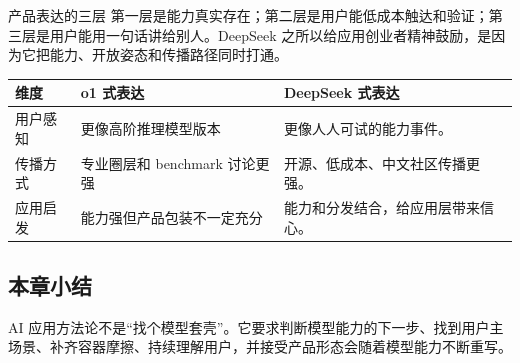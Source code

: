\begin{importantbox}{产品表达的三层}
第一层是能力真实存在；第二层是用户能低成本触达和验证；第三层是用户能用一句话讲给别人。DeepSeek 之所以给应用创业者精神鼓励，是因为它把能力、开放姿态和传播路径同时打通。
\end{importantbox}

\noindent\begin{tabularx}{\textwidth}{p{}p{}X}
\toprule
维度 & o1 式表达 & DeepSeek 式表达 \\
\midrule
用户感知 & 更像高阶推理模型版本 & 更像人人可试的能力事件。 \\
传播方式 & 专业圈层和 benchmark 讨论更强 & 开源、低成本、中文社区传播更强。 \\
应用启发 & 能力强但产品包装不一定充分 & 能力和分发结合，给应用层带来信心。 \\
\bottomrule
\end{tabularx}

\subsection{本章小结}

AI 应用方法论不是“找个模型套壳”。它要求判断模型能力的下一步、找到用户主场景、补齐容器摩擦、持续理解用户，并接受产品形态会随着模型能力不断重写。

